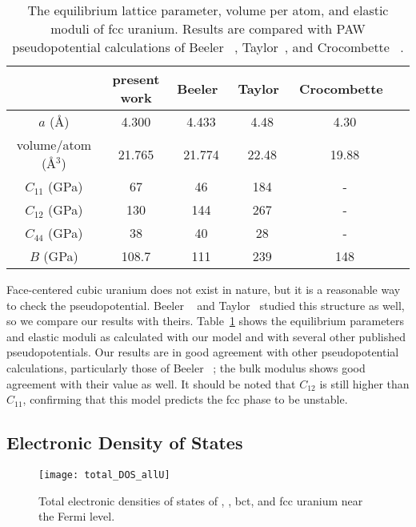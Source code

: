 \begin{table}
\caption[The equilibrium lattice parameter, volume per atom, and elastic moduli
of fcc uranium.]{The equilibrium lattice parameter, volume per atom, and elastic moduli
of fcc uranium. Results are compared with PAW pseudopotential calculations of
Beeler \etal~\cite{beeler2013first}, Taylor~\cite{taylor2008evaluation}, and
Crocombette \etal~\cite{crocombette2001plane}.}
\label{table:eq_fcc}
\begin{tabular}{cccccc}
  \toprule
				   & present work & Beeler~\cite{beeler2013first} & Taylor~\cite{taylor2008evaluation} & Crocombette~\cite{crocombette2001plane} \\ \midrule
$a$ (\AA)				   & 4.300  		  & 4.433	& 4.48	 & 4.30				\\
volume/atom (\AA$^3$)	   & 21.765   & 21.774	& 22.48  & 19.88			\\ 
$C_{11}$ (GPa) &  	67			& 46	 & 184 &-	  \\
$C_{12}$ (GPa) &	130			& 144	 & 267 &-	  \\
$C_{44}$ (GPa) &	38			& 40	 & 28  &-   \\
$B$ (GPa)		&	108.7		& 111	 & 239	&148	\\
  \bottomrule
\end{tabular}
\end{table}
Face-centered cubic uranium does not exist in nature, but it is a reasonable
way to check the pseudopotential. Beeler \etal~\cite{beeler2013first} and
Taylor~\cite{taylor2008evaluation} studied this structure as well, so we
compare our results with theirs.
Table~\ref{table:eq_fcc} shows the equilibrium parameters and elastic moduli
as calculated with our model and with several other published pseudopotentials.
Our results are in good agreement with other pseudopotential calculations,
particularly those of Beeler \etal~\cite{beeler2013first};
the bulk modulus shows good agreement with their value as well.
It should be noted that $C_{12}$ is still higher than $C_{11}$, confirming that this model predicts the fcc phase to be unstable.

\subsection{Electronic Density of States}
\begin{figure}
	\centering
	\texttt{[image: total\_DOS\_allU]}
    \caption{Total electronic densities of states of \textalpha, \textgamma,
      bct, and fcc uranium near the Fermi level.}
	\label{fig:totDos}
\end{figure}

